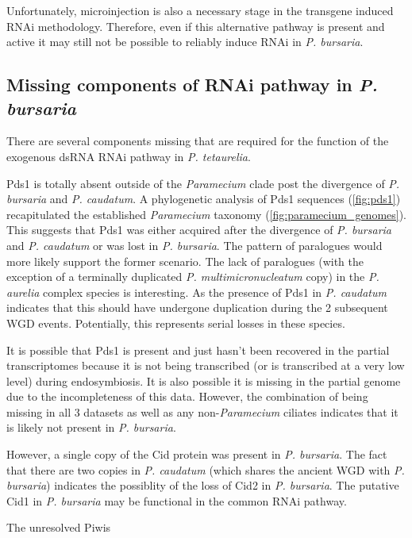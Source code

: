 Unfortunately, microinjection is also a necessary stage in the transgene
induced RNAi methodology.  Therefore, even if this alternative pathway
is present and active it may still not be possible to reliably 
induce RNAi in \textit{P. bursaria}.


\subsection{Missing components of RNAi pathway in \textit{P. bursaria}}

There are several components missing that are required for the function
of the exogenous dsRNA RNAi pathway in \textit{P. tetaurelia}.

Pds1 is totally absent outside of the \textit{Paramecium} clade post the divergence
of \textit{P. bursaria} and \textit{P. caudatum}.  A phylogenetic
analysis of Pds1 sequences (\cref{fig:pds1}) recapitulated the established 
\textit{Paramecium} taxonomy (\cref{fig:paramecium_genomes}).
This suggests that Pds1 was either acquired after the divergence of \textit{P. bursaria}
and \textit{P. caudatum} or was lost in \textit{P. bursaria}.
The pattern of paralogues would more likely support the former scenario.
The lack of paralogues (with the exception of a terminally duplicated \textit{P. multimicronucleatum}
copy) in the \textit{P. aurelia} complex species is interesting.  As the presence
of Pds1 in \textit{P. caudatum} indicates that this should have undergone
duplication during the 2 subsequent WGD events.  Potentially, this represents
serial losses in these species.

It is possible that Pds1 is present and just hasn't been recovered 
in the partial transcriptomes because it is not being transcribed (or is 
transcribed at a very low level) during endosymbiosis.  It is also
possible it is missing in the partial genome due to the incompleteness
of this data.  However, the combination of being missing in all 3 datasets
as well as any non-\textit{Paramecium} ciliates indicates that
it is likely not present in \textit{P. bursaria}.

However, a single copy of the Cid protein was present in \textit{P. bursaria}.
The fact that there are two copies in \textit{P. caudatum} (which 
shares the ancient WGD with \textit{P. bursaria}) indicates the possiblity
of the loss of Cid2 in \textit{P. bursaria}.
The putative Cid1 in \textit{P. bursaria} may be functional in the common
RNAi pathway.

The unresolved Piwis 


